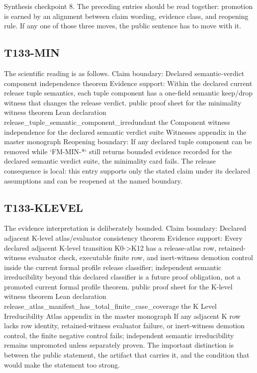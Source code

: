 Synthesis checkpoint 8. The preceding entries should be read together: promotion is earned by an alignment between claim wording, evidence class, and reopening rule. If any one of those three moves, the public sentence has to move with it.

\subsection{T133-MIN}
The scientific reading is as follows. Claim boundary: Declared semantic-verdict component independence theorem Evidence support: Within the declared current release tuple semantics, each tuple component has a one-field semantic keep/drop witness that changes the release verdict. public proof sheet for the minimality witness theorem Lean declaration release\_tuple\_semantic\_component\_irredundant the Component witness independence for the declared semantic verdict suite Witnesses appendix in the master monograph Reopening boundary: If any declared tuple component can be removed while `FM-MIN-*` still returns bounded evidence recorded for the declared semantic verdict suite, the minimality card fails. The release consequence is local: this entry supports only the stated claim under its declared assumptions and can be reopened at the named boundary.

\subsection{T133-KLEVEL}
The evidence interpretation is deliberately bounded. Claim boundary: Declared adjacent K-level atlas/evaluator consistency theorem Evidence support: Every declared adjacent K-level transition K0-\textgreater{}K12 has a release-atlas row, retained-witness evaluator check, executable finite row, and inert-witness demotion control inside the current formal profile release classifier; independent semantic irreducibility beyond this declared classifier is a future proof obligation, not a promoted current formal profile theorem. public proof sheet for the K-level witness theorem Lean declaration release\_atlas\_manifest\_has\_total\_finite\_case\_coverage the K Level Irreducibility Atlas appendix in the master monograph If any adjacent K row lacks row identity, retained-witness evaluator failure, or inert-witness demotion control, the finite negative control fails; independent semantic irreducibility remains unpromoted unless separately proven. The important distinction is between the public statement, the artifact that carries it, and the condition that would make the statement too strong.
